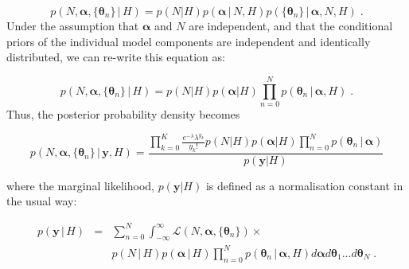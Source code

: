 \documentclass[12pt]{emulateapj}
\newcommand{\given}{\,|\,}
\newcommand{\counts}{y}
\newcommand{\likelihood}{{\mathcal L}}
\begin{document}
\begin{equation}
p(N, \bm{\alpha}, \{\bm{\theta}_n \} \given H) = p(N | H)p(\bm{\alpha}\given N, H)p(\{\bm{\theta}_n\}\given \bm{\alpha}, N, H) \; .
\end{equation}
Under the assumption that $\bm{\alpha}$ and $N$ are independent, and that the conditional priors of the individual model components are
independent and identically distributed, we can re-write this equation as:

\begin{equation}
p(N, \bm{\alpha}, \{\bm{\theta}_n \} \given H) = p(N|H)p(\bm{\alpha}|H) \prod\limits_{n=0}^{N}  p(\bm{\theta}_n\given \bm{\alpha}, H) \; .
\end{equation}
Thus, the posterior probability density becomes

\begin{equation}
p(N, \bm{\alpha}, \{\bm{\theta}_n \}  \given \bm{\counts}, H) =  \frac{\prod\limits_{k=0}^{K}{ \frac{e^{-\lambda} \lambda^{y_k} }{y_k! }} p(N|H)p(\bm{\alpha}|H) \prod\limits_{n=0}^{N}  p(\bm{\theta}_n\given \bm{\alpha})}{p(\bm{\counts} | H)}
\end{equation}

where the marginal likelihood, $p(\bm{\counts} | H)$ is defined as a normalisation constant in the usual way: 

\begin{eqnarray}
p(\bm{\counts} \given H) & = & \sum_{n=0}^{N} \int_{-\infty}^{\infty}{\likelihood(N, \bm{\alpha}, \{\bm{\theta}_n \})} \times \\ \nonumber
&& p(N\given H)p(\bm{\alpha} \given H) \prod\limits_{n=0}^{N}  p(\bm{\theta}_n\given \bm{\alpha}, H) d\bm{\alpha} d\bm{\theta}_1 ... d\bm{\theta}_N \; .
\label{eqn:marginal}
\end{eqnarray}

\end{document}
